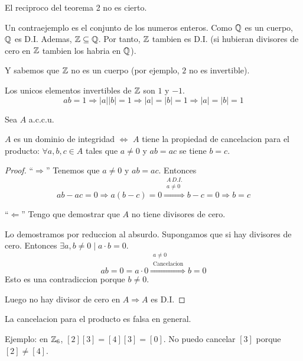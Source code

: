 \begin{remark}
	El reciproco del teorema 2 no es cierto.
	
	Un contraejemplo es el conjunto de los numeros enteros. Como \(\mathbb{Q} \) es un cuerpo, \(\mathbb{Q} \) es D.I. Ademas, \(\mathbb{Z} \subseteq \mathbb{Q} \). Por tanto, \(\mathbb{Z} \) tambien es D.I. (si hubieran divisores de cero en \(\mathbb{Z} \) tambien los habria en \(\mathbb{Q} \)).
	
	Y sabemos que \(\mathbb{Z} \) no es un cuerpo (por ejemplo, \(2\) no es invertible).
\end{remark}
\begin{remark}
	Los unicos elementos invertibles de \(\mathbb{Z} \) son \(1 \) y \(-1\).
	\[
		ab = 1 \Rightarrow |a| |b| = 1 \Rightarrow |a| = |b| = 1 \Rightarrow |a| = |b| = 1
	\]
\end{remark}

\begin{lemma}
	Sea \(A \) a.c.c.u.
	
	\(A \) es un dominio de integridad \(\iff \) \(A \) tiene la propiedad de cancelacion para el producto: \(\forall a,b,c \in A \) tales que \(a \neq 0 \) y \(ab = ac \) se tiene \(b = c \).
\end{lemma}

\vspace{1.2cm}
\begin{proof}
	``\(\Rightarrow \)'' Tenemos que \(a \neq  0 \) y \(ab = ac \). Entonces
	\[
		ab - ac = 0 \Rightarrow a(b-c) = 0 \overset{\substack{A\, D.I. \\ a \neq 0}}{\Rightarrow} b-c = 0 \Rightarrow b= c
	\]
	
	``\(\Leftarrow \)'' Tengo que demostrar que \(A \) no tiene divisores de cero.
	
	Lo demostramos por reduccion al absurdo. Supongamos que si hay divisores de cero. Entonces \(\exists  a,b \neq 0 \mid a \cdot b = 0 \).
	\[
		ab = 0 = a \cdot 0 \overset{\substack{a \neq 0 \\ \text{Cancelacion} }}{\Rightarrow} b = 0
	\]
	Esto es una contradiccion porque \(b \neq 0 \).
	
	Luego no hay divisor de cero en \(A \Rightarrow A\) es D.I.
\end{proof}
\begin{remark}
	La cancelacion para el producto es falsa en general.
	
	Ejemplo: en \(\mathbb{Z}_6 \), \([2][3] = [4][3] = [0]\). No puedo cancelar \([3]\) porque \([2] \neq [4]\).
\end{remark}


